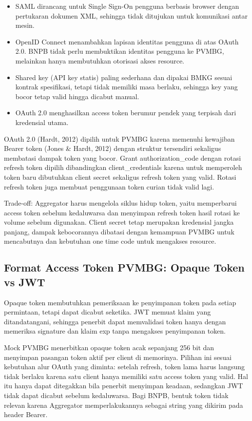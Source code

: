 \begin{itemize}
\tightlist
\item
  SAML dirancang untuk Single Sign-On pengguna berbasis browser dengan pertukaran dokumen XML, sehingga tidak ditujukan untuk komunikasi antar mesin.\\
\item
  OpenID Connect menambahkan lapisan identitas pengguna di atas OAuth 2.0. BNPB tidak perlu membuktikan identitas pengguna ke PVMBG, melainkan hanya membutuhkan otorisasi akses resource.\\
\item
  Shared key (API key statis) paling sederhana dan dipakai BMKG sesuai kontrak spesifikasi, tetapi tidak memiliki masa berlaku, sehingga key yang bocor tetap valid hingga dicabut manual.\\
\item
  OAuth 2.0 menghasilkan access token berumur pendek yang terpisah dari kredensial utama.
\end{itemize}

OAuth 2.0 (Hardt, 2012) dipilih untuk PVMBG karena memenuhi kewajiban Bearer token (Jones \& Hardt, 2012) dengan struktur tersendiri sekaligus membatasi dampak token yang bocor. Grant authorization\_code dengan rotasi refresh token dipilih dibandingkan client\_credentials karena untuk memperoleh token baru dibutuhkan client secret sekaligus refresh token yang valid. Rotasi refresh token juga membuat penggunaan token curian tidak valid lagi.

Trade-off: Aggregator harus mengelola siklus hidup token, yaitu memperbarui access token sebelum kedaluwarsa dan menyimpan refresh token hasil rotasi ke volume sebelum digunakan. Client secret tetap merupakan kredensial jangka panjang, dampak kebocorannya dibatasi dengan kemampuan PVMBG untuk mencabutnya dan kebutuhan one time code untuk mengakses resource.

\subsection{Format Access Token PVMBG: Opaque Token vs JWT}

Opaque token membutuhkan pemeriksaan ke penyimpanan token pada setiap permintaan, tetapi dapat dicabut seketika. JWT memuat klaim yang ditandatangani, sehingga penerbit dapat memvalidasi token hanya dengan memeriksa signature dan klaim exp tanpa mengakses penyimpanan token.

Mock PVMBG menerbitkan opaque token acak sepanjang 256 bit dan menyimpan pasangan token aktif per client di memorinya. Pilihan ini sesuai kebutuhan alur OAuth yang diminta: setelah refresh, token lama harus langsung tidak berlaku karena satu client hanya memiliki satu access token yang valid. Hal itu hanya dapat ditegakkan bila penerbit menyimpan keadaan, sedangkan JWT tidak dapat dicabut sebelum kedaluwarsa. Bagi BNPB, bentuk token tidak relevan karena Aggregator memperlakukannya sebagai string yang dikirim pada header Bearer.

